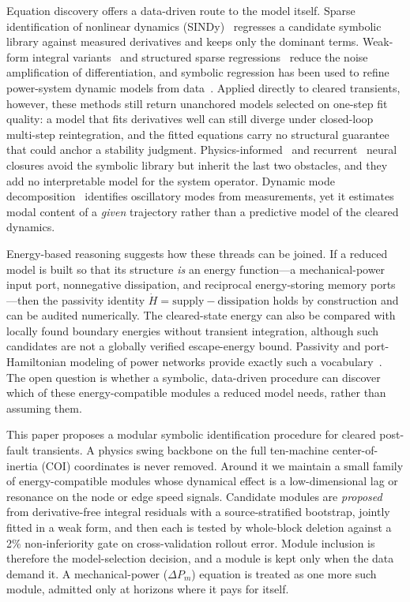 \documentclass[journal]{IEEEtran}
\begin{document}
Equation discovery offers a data-driven route to the model itself. Sparse
identification of nonlinear dynamics (SINDy)~\cite{brunton2016sindy} regresses a
candidate symbolic library against measured derivatives and keeps only the
dominant terms. Weak-form integral variants~\cite{messenger2021wsindy} and
structured sparse regressions~\cite{loiseau2018constrained} reduce the noise
amplification of differentiation, and symbolic regression has been used to
refine power-system dynamic models from data~\cite{saric2021symbolic}. Applied
directly to cleared transients, however, these methods still return unanchored
models selected on one-step fit quality: a model that fits derivatives well can
still diverge under closed-loop multi-step reintegration, and the fitted
equations carry no structural guarantee that could anchor a stability
judgment.
Physics-informed~\cite{raissi2019pinn} and recurrent~\cite{hochreiter1997lstm}
neural closures avoid the symbolic library but inherit the last two obstacles,
and they add no interpretable model for the system operator. Dynamic mode
decomposition~\cite{schmid2010dmd} identifies oscillatory modes from
measurements, yet it estimates modal content of a \emph{given} trajectory rather
than a predictive model of the cleared dynamics.

Energy-based reasoning suggests how these threads can be joined. If a reduced
model is built so that its structure \emph{is} an energy function---a
mechanical-power input port, nonnegative dissipation, and reciprocal
energy-storing memory ports---then the passivity identity
$\dot H = \text{supply}-\text{dissipation}$ holds by construction and can be
audited numerically. The cleared-state energy can also be compared with locally
found boundary energies without transient integration, although such candidates
are not a globally verified escape-energy bound. Passivity and
port-Hamiltonian modeling of power networks provide exactly such a
vocabulary~\cite{vanderschaft2017,fiaz2013porthamiltonian}. The open
question is whether a symbolic, data-driven procedure can discover which of these
energy-compatible modules a reduced model needs, rather than assuming them.

This paper proposes a modular symbolic identification procedure for cleared
post-fault transients. A physics swing backbone on the full ten-machine
center-of-inertia (COI) coordinates is never removed. Around it we maintain a
small family of energy-compatible modules whose dynamical effect is a
low-dimensional lag or resonance on the node or edge speed signals. Candidate
modules are \emph{proposed} from derivative-free integral residuals with a
source-stratified bootstrap, jointly fitted in a weak form, and then each is
tested by whole-block deletion against a 2\% non-inferiority gate on
cross-validation rollout error. Module inclusion is therefore the model-selection
decision, and a module is kept only when the data demand it. A mechanical-power
($\Delta P_m$) equation is treated as one more such module, admitted only at
horizons where it pays for itself.
\end{document}
